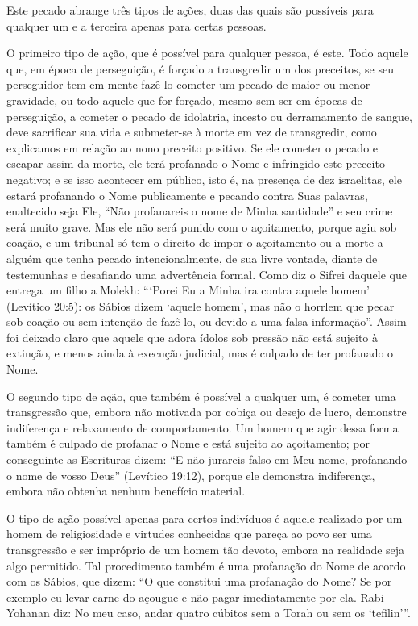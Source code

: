 Este pecado abrange três tipos de ações, duas das quais são possíveis
para qualquer um e a terceira apenas para certas pessoas.

O primeiro tipo de ação, que é possível para qualquer pessoa, é este.
Todo aquele que, em época de perseguição, é forçado a transgredir um dos
preceitos, se seu perseguidor tem em mente fazê-lo cometer um pecado de
maior ou menor gravidade, ou todo aquele que for forçado, mesmo sem ser
em épocas de perseguição, a cometer o pecado de idolatria, incesto ou
derramamento de sangue, deve sacrificar sua vida e submeter-se à morte
em vez de transgredir, como explicamos em relação ao nono preceito
positivo. Se ele cometer o pecado e escapar assim da morte, ele terá
profanado o Nome e infringido este preceito negativo; e se isso
acontecer em público, isto é, na presença de dez israelitas, ele estará
profanando o Nome publicamente e pecando contra Suas palavras,
enaltecido seja Ele, ``Não profanareis o nome de Minha santidade'' e seu
crime será muito grave. Mas ele não será punido com o açoitamento,
porque agiu sob coação, e um tribunal só tem o direito de impor o
açoitamento ou a morte a alguém que tenha pecado intencionalmente, de
sua livre vontade, diante de testemunhas e desafiando uma advertência
formal. Como diz o Sifrei daquele que entrega um filho a Molekh:
```Porei Eu a Minha ira contra aquele homem' (Levítico 20:5): os Sábios
dizem `aquele homem', mas não o horrlem que pecar sob coação ou sem
intenção de fazê-lo, ou devido a uma falsa informação''. Assim foi
deixado claro que aquele que adora ídolos sob pressão não está sujeito à
extinção, e menos ainda à execução judicial, mas é culpado de ter
profanado o Nome.

O segundo tipo de ação, que também é possível a qualquer um, é cometer
uma transgressão que, embora não motivada por cobiça ou desejo de lucro,
demonstre indiferença e relaxamento de comportamento. Um homem que agir
dessa forma também é culpado de profanar o Nome e está sujeito ao
açoitamento; por conseguinte as Escrituras dizem: ``E não jurareis falso
em Meu nome, profanando o nome de vosso Deus'' (Levítico 19:12), porque
ele demonstra indiferença, embora não obtenha nenhum benefício
material.

O tipo de ação possível apenas para certos indivíduos é aquele realizado
por um homem de religiosidade e virtudes conhecidas que pareça ao povo
ser uma transgressão e ser impróprio de um homem tão devoto, embora na
realidade seja algo permitido. Tal procedimento também é uma profanação
do Nome de acordo com os Sábios, que dizem: ``O que constitui uma
profanação do Nome? Se por exemplo eu levar carne do açougue e não
pagar imediatamente por ela. Rabi Yohanan diz: No meu caso, andar
quatro cúbitos sem a Torah ou sem os `tefilin'''.

